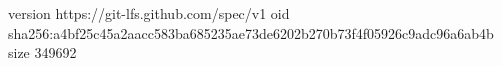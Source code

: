 version https://git-lfs.github.com/spec/v1
oid sha256:a4bf25c45a2aacc583ba685235ae73de6202b270b73f4f05926c9adc96a6ab4b
size 349692
